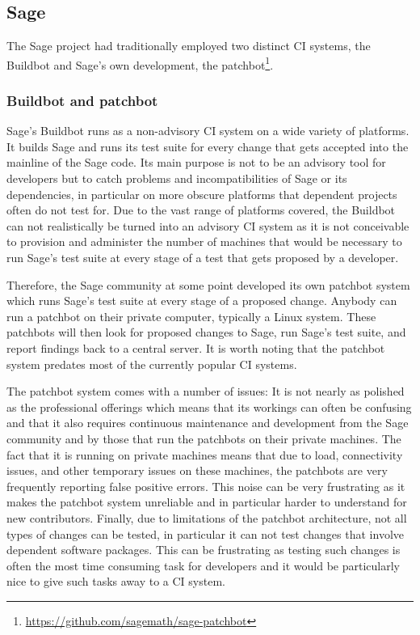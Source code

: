 \documentclass{deliverablereport}
\begin{document}
\subsection{Sage}

The Sage project had traditionally employed two distinct CI systems, the
Buildbot and Sage's own development, the
patchbot\footnote{\url{https://github.com/sagemath/sage-patchbot}}.

\subsubsection{Buildbot and patchbot}
Sage's Buildbot runs as a non-advisory CI system on a wide variety of
platforms. It builds Sage and runs its test suite for every change that gets
accepted into the mainline of the Sage code. Its main purpose is not to be an
advisory tool for developers but to catch problems and incompatibilities of
Sage or its dependencies, in particular on more obscure platforms that
dependent projects often do not test for. Due to the vast range of platforms
covered, the Buildbot can not realistically be turned into an advisory CI
system as it is not conceivable to provision and administer the number of
machines that would be necessary to run Sage's test suite at every stage of a
test that gets proposed by a developer.

Therefore, the Sage community at some point developed its own patchbot system
which runs Sage's test suite at every stage of a proposed change. Anybody can
run a patchbot on their private computer, typically a Linux system. These
patchbots will then look for proposed changes to Sage, run Sage's test suite,
and report findings back to a central server. It is worth noting that the
patchbot system predates most of the currently popular CI systems.

The patchbot system comes with a number of issues: It is not nearly as polished
as the professional offerings which means that its workings can often be
confusing and that it also requires continuous maintenance and development from
the Sage community and by those that run the patchbots on their private
machines. The fact that it is running on private machines means that due to
load, connectivity issues, and other temporary issues on these machines, the
patchbots are very frequently reporting false positive errors.
This noise can be very
frustrating as it makes the patchbot system unreliable and in particular harder
to understand for new contributors. Finally, due to limitations of the patchbot
architecture, not all types of changes can be tested, in particular it can not
test changes that involve dependent software packages. This can be frustrating
as testing such changes is often the most time consuming task for developers
and it would be particularly nice to give such tasks away to a CI system.
\end{document}
